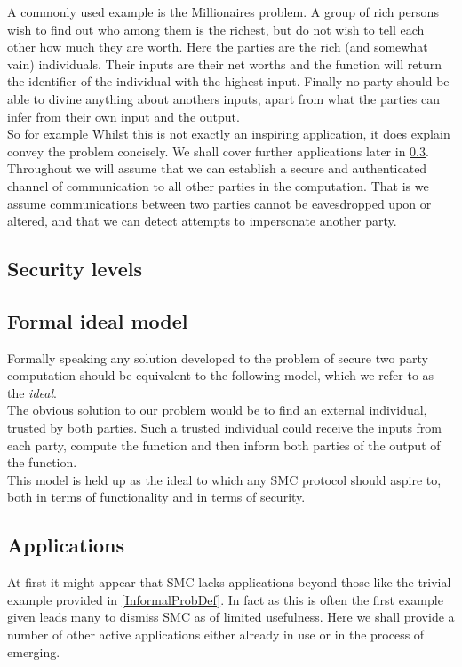 \documentclass[a4paper,10pt]{article}
\begin{document}
      A commonly used example is the Millionaires problem. A group of rich persons wish to find out who among them is the richest, but do not wish to tell each other how much they are worth. Here the parties are the rich (and somewhat vain) individuals. Their inputs are their net worths and the function will return the identifier of the individual with the highest input. Finally no party should be able to divine anything about anothers inputs, apart from what the parties can infer from their own input and the output.\\
      
      So for example Whilst this is not exactly an inspiring application, it does explain convey the problem concisely. We shall cover further applications later in \ref{Applications}.\\

      Throughout we will assume that we can establish a secure and authenticated channel of communication to all other parties in the computation. That is we assume communications between two parties cannot be eavesdropped upon or altered, and that we can detect attempts to impersonate another party.

    \subsection{Security levels}\label{securityLevels}


    \subsection{Formal ideal model}
      Formally speaking any solution developed to the problem of secure two party computation should be equivalent to the following model, which we refer to as the \emph{ideal}.\\

      The obvious solution to our problem would be to find an external individual, trusted by both parties. Such a trusted individual could receive the inputs from each party, compute the function and then inform both parties of the output of the function.\\

      This model is held up as the ideal to which any SMC protocol should aspire to, both in terms of functionality and in terms of security.
	


    \subsection{Applications} \label{Applications}
      At first it might appear that SMC lacks applications beyond those like the trivial example provided in \ref{InformalProbDef}. In fact as this is often the first example given leads many to dismiss SMC as of limited usefulness. Here we shall provide a number of other active applications either already in use or in the process of emerging.\\
      
\end{document}
